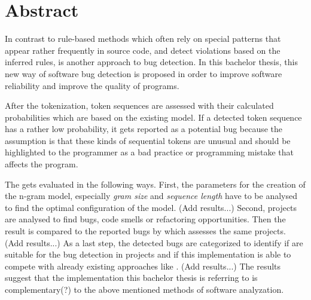 \chapter*{Abstract}

In contrast to rule-based methods which often rely on special patterns that appear rather frequently in source code, and detect violations based on the inferred rules, \ngram{} is another approach to bug detection. In this bachelor thesis, this new way of software bug detection is proposed in order to improve software reliability and improve the quality of \scratch{} programs.

After the tokenization, token sequences are assessed with their calculated probabilities which are based on the existing model. If a detected token sequence has a rather low probability, it gets reported as a potential bug because the assumption is that these kinds of sequential tokens are unusual and should be highlighted to the programmer as a bad practice or programming mistake that affects the program.

The \ngram{} gets evaluated in the following ways. First, the parameters for the creation of the n-gram model, especially \textit{gram size} and \textit{sequence length} have to be analysed to find the optimal configuration of the model. (Add results...) Second, \scratch{} projects are analysed to find bugs, code smells or refactoring opportunities. Then the result is compared to the reported bugs by \litterbox{} which assesses the same projects. (Add results...) As a last step, the detected bugs are categorized to identify if  are suitable for the bug detection in \scratch{} projects and if this implementation is able to compete with already existing approaches like \litterbox{}. (Add results...) The results suggest that the implementation this bachelor thesis is referring to is complementary(?) to the above mentioned methods of software analyzation.
 